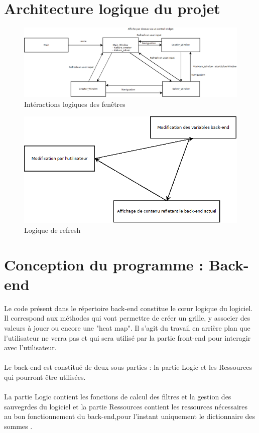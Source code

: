 \documentclass[french,12pt]{article}
\begin{document}
\section{Architecture logique du projet}

\begin{figure}[h]
\includegraphics[scale=0.40]{./ressources/Diagramme2.png}
\caption{Intéractions logiques des fenêtres}
\label{fig:x cubed graph}
\end{figure}

\vspace{3cm}

\begin{figure}[h]
\includegraphics[scale=0.45]{./ressources/Diagramme1.png}
\caption{Logique de refresh}
\label{fig:x cubed graph}
\end{figure}

\newpage
\section{Conception du programme : Back-end}
Le code présent dans le répertoire back-end constitue le cœur logique du logiciel. Il correspond aux méthodes qui vont permettre de créer un grille, y associer des valeurs à jouer ou  encore une "heat map". Il s'agit du travail en arrière plan que l'utilisateur ne verra pas et qui sera utilisé par la partie front-end pour interagir avec l'utilisateur.
\\ \\ 
Le back-end est constitué de deux sous parties : la partie Logic et les Ressources qui pourront être utilisées. \\ \\
La partie Logic contient les fonctions de calcul des filtres et la gestion des sauvegrdes du logiciel et la partie Ressources contient les ressources nécessaires au bon fonctionnement du back-end,pour l'instant uniquement le  dictionnaire des sommes .
\end{document}
